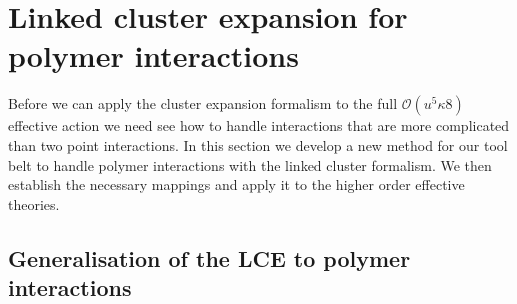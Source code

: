 \section{Linked cluster expansion for polymer interactions}

Before we can apply the cluster expansion formalism to the full $\mathcal{O}(u^5
\kappa8)$ effective action we need see how to handle interactions that are more
complicated than two point interactions. In this section we develop a new method
for our tool belt to handle polymer interactions with the linked cluster
formalism. We then establish the necessary mappings and apply it to the higher
order effective theories.

\subsection{Generalisation of the LCE to polymer interactions}

